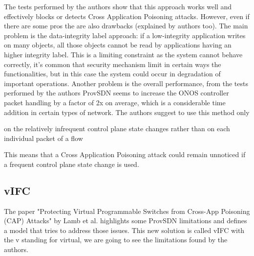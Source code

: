 \medskip

The tests performed by the authors show that this approach works well and effectively blocks or detects Cross Application Poisoning attacks. However, even if there are some pros the are also drawbacks (explained by authors too). The main problem is the data-integrity label approach: if a low-integrity application writes on many objects, all those objects cannot be read by applications having an higher integrity label. This is a limiting constraint as the system cannot behave correctly, it's common that security mechanism limit in certain ways the functionalities, but in this case the system could occur in degradation of important operations. Another problem is the overall performance, from the tests performed by the authors ProvSDN seems to increase the ONOS controller packet handling by a factor of 2x on average, which is a considerable time addition in certain types of network. The authors suggest to use this method only \begin{quoting}[font=itshape, begintext={"}, endtext={"}]on the relatively infrequent control plane state changes rather than on each individual packet of a flow\end{quoting} This means that a Cross Application Poisoning attack could remain unnoticed if a frequent control plane state change is used. 

\subsection{vIFC}

The paper "Protecting Virtual Programmable Switches from Cross-App Poisoning (CAP) Attacks" by Lamb et al. highlights some ProvSDN limitations and defines a model that tries to address those issues. This new solution is called vIFC with the v standing for virtual, we are going to see the limitations found by the authors.\cite{virtual-cap-sdn}

